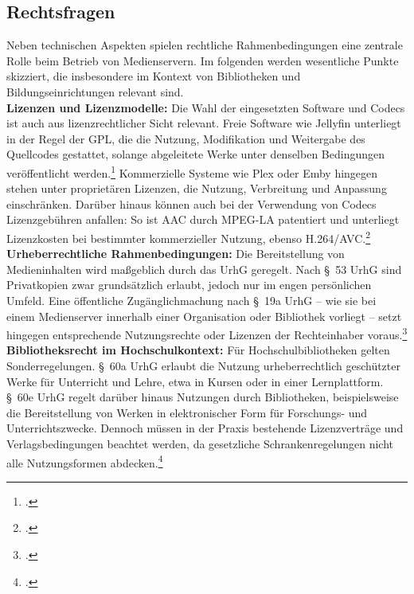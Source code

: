 \documentclass[12pt,a4paper]{report}
\begin{document}
  \subsection{Rechtsfragen}  
  Neben technischen Aspekten spielen rechtliche Rahmenbedingungen eine zentrale Rolle beim Betrieb von Medienservern.
  Im folgenden werden wesentliche Punkte skizziert, die insbesondere im Kontext von Bibliotheken und Bildungseinrichtungen relevant sind. 
  \\
  \newline
  \textbf{Lizenzen und Lizenzmodelle:}  
  Die Wahl der eingesetzten Software und Codecs ist auch aus lizenzrechtlicher Sicht relevant.  
  Freie Software wie Jellyfin unterliegt in der Regel der \ac{GPL}, die die Nutzung, Modifikation und Weitergabe des Quellcodes gestattet, 
  solange abgeleitete Werke unter denselben Bedingungen veröffentlicht werden.\footcite[Vgl.][]{gnu_gplv3}  
  Kommerzielle Systeme wie Plex oder Emby hingegen stehen unter proprietären Lizenzen, die Nutzung, Verbreitung und Anpassung einschränken.  
  Darüber hinaus können auch bei der Verwendung von Codecs Lizenzgebühren anfallen: So ist \ac{AAC} durch MPEG-LA patentiert 
  und unterliegt Lizenzkosten bei bestimmter kommerzieller Nutzung, ebenso H.264/\ac{AVC}.\footcite[Vgl.][]{wikipedia_mpegla}  
  \\
  \newline
  \textbf{Urheberrechtliche Rahmenbedingungen:}  
  Die Bereitstellung von Medieninhalten wird maßgeblich durch das \ac{UrhG} geregelt.  
  Nach §~53 \ac{UrhG} sind Privatkopien zwar grundsätzlich erlaubt, jedoch nur im engen persönlichen Umfeld.  
  Eine öffentliche Zugänglichmachung nach §~19a \ac{UrhG} – wie sie bei einem Medienserver innerhalb einer Organisation oder Bibliothek vorliegt –
  setzt hingegen entsprechende Nutzungsrechte oder Lizenzen der Rechteinhaber voraus.\footcite[Vgl.][§§~53, 19a UrhG]{urhg2025}  
  \\
  \newline
  \textbf{Bibliotheksrecht im Hochschulkontext:}  
  Für Hochschulbibliotheken gelten Sonderregelungen.  
  §~60a \ac{UrhG} erlaubt die Nutzung urheberrechtlich geschützter Werke für Unterricht und Lehre, etwa in Kursen oder in einer Lernplattform.  
  §~60e \ac{UrhG} regelt darüber hinaus Nutzungen durch Bibliotheken, beispielsweise die Bereitstellung von Werken in elektronischer Form für Forschungs- und Unterrichtszwecke.  
  Dennoch müssen in der Praxis bestehende Lizenzverträge und Verlagsbedingungen beachtet werden, 
  da gesetzliche Schrankenregelungen nicht alle Nutzungsformen abdecken.\footcite[Vgl.][§§~60a, 60e UrhG]{urhg2025}  
\end{document}
